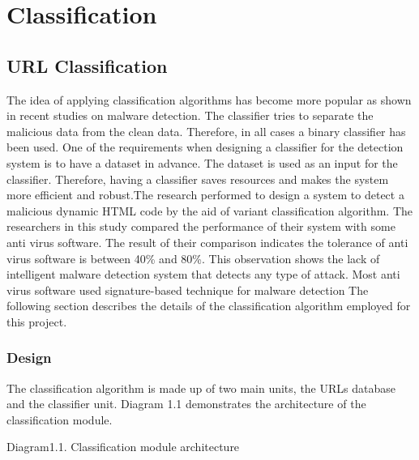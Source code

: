 \section{Classification}

\subsection{URL Classification}

The idea of applying classification algorithms has become more popular as shown in recent studies on malware detection. The classifier tries to separate the malicious data from the clean data. Therefore, in all cases a binary classifier has been used. One of the requirements when designing a classifier for the detection system is to have a dataset in advance. The dataset is used as an input for the classifier. Therefore, having a classifier saves resources and makes the system more efficient and robust.The research performed to design a system to detect a malicious dynamic HTML code by the aid of variant classification algorithm. The researchers in this study compared the performance of their system with some anti virus software. The result of their comparison indicates the tolerance of anti virus software is between 40\% and 80\%. This observation shows the lack of intelligent malware detection system that detects any type of attack. Most anti virus software used signature-based technique for malware detection\cite{Macilious-weblearning}  
 The following section describes the details of the classification algorithm employed for this project. 
\subsubsection{Design}
The classification algorithm is made up of two main units, the URLs database and the classifier unit. Diagram 1.1 demonstrates the architecture of the classification module.



Diagram1.1. Classification module architecture

